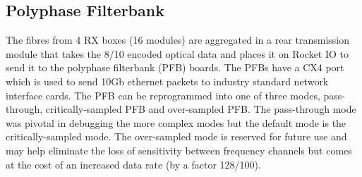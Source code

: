 \subsection{Polyphase Filterbank}
The fibres from 4 RX boxes (16 modules) are aggregated in a rear transmission module that takes the 8/10 encoded optical data and places it on Rocket IO to send it to the polyphase filterbank (PFB) boards. The PFBs have a CX4 port which is used to send 10Gb ethernet packets to industry standard network interface cards. The PFB can be reprogrammed into one of three modes, pass-through, critically-sampled PFB and over-sampled PFB. The pass-through mode was pivotal in debugging the more complex modes but the default mode is the critically-sampled mode. The over-sampled mode is reserved for future use and may help eliminate the loss of sensitivity between frequency channels but comes at the cost of an increased data rate (by a factor 128/100).